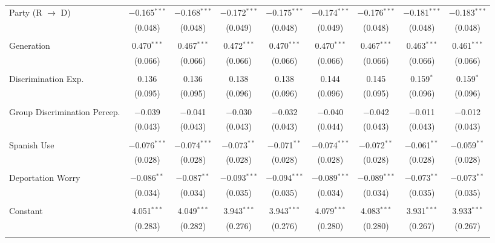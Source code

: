 \begin{table}[!htbp]
\begin{tabular}{@{\extracolsep{5pt}}lcccccccc}
 Party (R $\longrightarrow$ D) & $-$0.165$^{***}$ & $-$0.168$^{***}$ & $-$0.172$^{***}$ & $-$0.175$^{***}$ & $-$0.174$^{***}$ & $-$0.176$^{***}$ & $-$0.181$^{***}$ & $-$0.183$^{***}$ \\ 
  & (0.048) & (0.048) & (0.049) & (0.048) & (0.049) & (0.048) & (0.048) & (0.048) \\ 
  & & & & & & & & \\ 
 Generation & 0.470$^{***}$ & 0.467$^{***}$ & 0.472$^{***}$ & 0.470$^{***}$ & 0.470$^{***}$ & 0.467$^{***}$ & 0.463$^{***}$ & 0.461$^{***}$ \\ 
  & (0.066) & (0.066) & (0.066) & (0.066) & (0.066) & (0.066) & (0.066) & (0.066) \\ 
  & & & & & & & & \\ 
 Discrimination Exp. & 0.136 & 0.136 & 0.138 & 0.138 & 0.144 & 0.145 & 0.159$^{*}$ & 0.159$^{*}$ \\ 
  & (0.095) & (0.095) & (0.096) & (0.096) & (0.096) & (0.095) & (0.096) & (0.096) \\ 
  & & & & & & & & \\ 
 Group Discrimination Percep. & $-$0.039 & $-$0.041 & $-$0.030 & $-$0.032 & $-$0.040 & $-$0.042 & $-$0.011 & $-$0.012 \\ 
  & (0.043) & (0.043) & (0.043) & (0.043) & (0.044) & (0.043) & (0.043) & (0.043) \\ 
  & & & & & & & & \\ 
 Spanish Use & $-$0.076$^{***}$ & $-$0.074$^{***}$ & $-$0.073$^{**}$ & $-$0.071$^{**}$ & $-$0.074$^{***}$ & $-$0.072$^{**}$ & $-$0.061$^{**}$ & $-$0.059$^{**}$ \\ 
  & (0.028) & (0.028) & (0.028) & (0.028) & (0.028) & (0.028) & (0.028) & (0.028) \\ 
  & & & & & & & & \\ 
 Deportation Worry & $-$0.086$^{**}$ & $-$0.087$^{**}$ & $-$0.093$^{***}$ & $-$0.094$^{***}$ & $-$0.089$^{***}$ & $-$0.089$^{***}$ & $-$0.073$^{**}$ & $-$0.073$^{**}$ \\ 
  & (0.034) & (0.034) & (0.035) & (0.035) & (0.034) & (0.034) & (0.035) & (0.035) \\ 
  & & & & & & & & \\ 
 Constant & 4.051$^{***}$ & 4.049$^{***}$ & 3.943$^{***}$ & 3.943$^{***}$ & 4.079$^{***}$ & 4.083$^{***}$ & 3.931$^{***}$ & 3.933$^{***}$ \\ 
  & (0.283) & (0.282) & (0.276) & (0.276) & (0.280) & (0.280) & (0.267) & (0.267) \\ 
  & & & & & & & & \\ 

\end{tabular}
\end{table}
